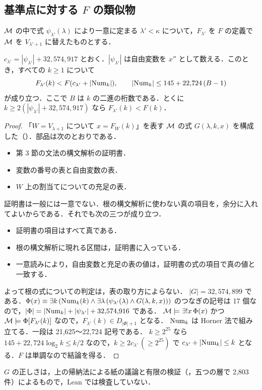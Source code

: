 \subsection{基準点に対する $F$ の類似物}
$\mathcal{M}$ の中で式 $\psi_{\lambda'}(\lambda)$ により一意に定まる $\lambda'<\kappa$ について，$F_{\lambda'}$ を $F$ の定義で $\mathcal{M}$ を $V_{\lambda'+1}$ に替えたものとする．

\begin{theorem}\label{thm:fsub}
$c_{\lambda'}=|\psi_{\lambda'}|+32{,}574{,}917$ とおく．$|\psi_{\lambda'}|$ は自由変数を $x''$ として数える．このとき，すべての $k\ge 1$ について
\[ F_{\lambda'}(k) < F(c_{\lambda'}+|\mathrm{Num}_k|),\qquad |\mathrm{Num}_k|\le 145+22{,}724\,(B-1) \]
が成り立つ．ここで $B$ は $k$ の二進の桁数である．とくに $k\ge 2(|\psi_{\lambda'}|+32{,}574{,}917)$ なら $F_{\lambda'}(k)<F(k)$．
\end{theorem}
\begin{proof}
「$W=V_{\lambda+1}$ について $x=F_W(k)$」を表す $\mathcal{M}$ の式 $G(\lambda,k,x)$ を構成した（）．部品は次のとおりである．
\begin{itemize}
\item 第 3 節の文法の構文解析の証明書．
\item 変数の番号の表と自由変数の表．
\item $W$ 上の割当てについての充足の表．
\end{itemize}
証明書は一般には一意でない．根の構文解析に使わない真の項目を，余分に入れてよいからである．それでも次の三つが成り立つ．
\begin{itemize}
\item 証明書の項目はすべて真である．
\item 根の構文解析に現れる区間は，証明書に入っている．
\item 一意読みにより，自由変数と充足の表の値は，証明書の式の項目で真の値と一致する．
\end{itemize}
よって根の式についての判定は，表の取り方によらない．
$|G|=32{,}574{,}899$ である．$\Phi(x)\equiv\exists k\,(\mathrm{Num}_k(k)\wedge\exists\lambda\,(\psi_{\lambda'}(\lambda)\wedge G(\lambda,k,x)))$ のつなぎの記号は 17 個なので，$|\Phi|=|\mathrm{Num}_k|+|\psi_{\lambda'}|+32{,}574{,}916$ である．
$\mathcal{M}\models\exists!x\,\Phi(x)$ かつ $\mathcal{M}\models\Phi[F_{\lambda'}(k)]$ なので，$F_{\lambda'}(k)\in D_{|\Phi|+1}$ となる．
$\mathrm{Num}_k$ は Horner 法で組み立てる．一段は 21{,}625〜22{,}724 記号である．
$k\ge 2^{25}$ なら $145+22{,}724\log_2 k\le k/2$ なので，$k\ge 2c_{\lambda'}\,(\ge 2^{25})$ で $c_{\lambda'}+|\mathrm{Num}_k|\le k$ となる．$F$ は単調なので結論を得る．
\end{proof}
$G$ の正しさは，上の帰納法による紙の議論と有限の検証（，五つの層で 2{,}803 件）によるもので，Lean では検査していない．

